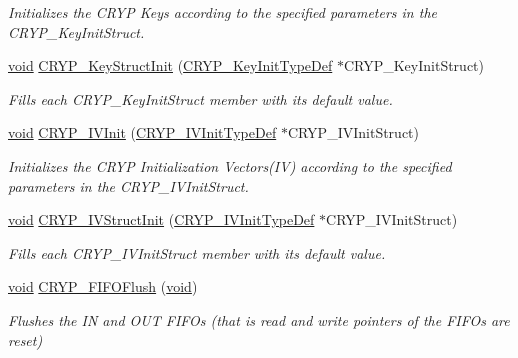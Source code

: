 \begin{DoxyCompactItemize}
\begin{DoxyCompactList}\small\item\em Initializes the C\-R\-Y\-P Keys according to the specified parameters in the C\-R\-Y\-P\-\_\-\-Key\-Init\-Struct. \end{DoxyCompactList}\item 
\hyperlink{group___n_a_m_e_ga18028b8badbf1ea7e704ccac3c488e82}{void} \hyperlink{group___c_r_y_p___group1_gaeecd86b00d0d0137d97b06108789bcb2}{C\-R\-Y\-P\-\_\-\-Key\-Struct\-Init} (\hyperlink{struct_c_r_y_p___key_init_type_def}{C\-R\-Y\-P\-\_\-\-Key\-Init\-Type\-Def} $\ast$C\-R\-Y\-P\-\_\-\-Key\-Init\-Struct)
\begin{DoxyCompactList}\small\item\em Fills each C\-R\-Y\-P\-\_\-\-Key\-Init\-Struct member with its default value. \end{DoxyCompactList}\item 
\hyperlink{group___n_a_m_e_ga18028b8badbf1ea7e704ccac3c488e82}{void} \hyperlink{group___c_r_y_p___group1_ga133964b50a07db3a32864308f6355a8b}{C\-R\-Y\-P\-\_\-\-I\-V\-Init} (\hyperlink{struct_c_r_y_p___i_v_init_type_def}{C\-R\-Y\-P\-\_\-\-I\-V\-Init\-Type\-Def} $\ast$C\-R\-Y\-P\-\_\-\-I\-V\-Init\-Struct)
\begin{DoxyCompactList}\small\item\em Initializes the C\-R\-Y\-P Initialization Vectors(\-I\-V) according to the specified parameters in the C\-R\-Y\-P\-\_\-\-I\-V\-Init\-Struct. \end{DoxyCompactList}\item 
\hyperlink{group___n_a_m_e_ga18028b8badbf1ea7e704ccac3c488e82}{void} \hyperlink{group___c_r_y_p___group1_ga58899074e08bbd65f2ed304cf0f42987}{C\-R\-Y\-P\-\_\-\-I\-V\-Struct\-Init} (\hyperlink{struct_c_r_y_p___i_v_init_type_def}{C\-R\-Y\-P\-\_\-\-I\-V\-Init\-Type\-Def} $\ast$C\-R\-Y\-P\-\_\-\-I\-V\-Init\-Struct)
\begin{DoxyCompactList}\small\item\em Fills each C\-R\-Y\-P\-\_\-\-I\-V\-Init\-Struct member with its default value. \end{DoxyCompactList}\item 
\hyperlink{group___n_a_m_e_ga18028b8badbf1ea7e704ccac3c488e82}{void} \hyperlink{group___c_r_y_p___group1_ga23ada9d9464e1362299d7612a1409a57}{C\-R\-Y\-P\-\_\-\-F\-I\-F\-O\-Flush} (\hyperlink{group___n_a_m_e_ga18028b8badbf1ea7e704ccac3c488e82}{void})
\begin{DoxyCompactList}\small\item\em Flushes the I\-N and O\-U\-T F\-I\-F\-Os (that is read and write pointers of the F\-I\-F\-Os are reset) \end{DoxyCompactList}\item 

\end{DoxyCompactItemize}
